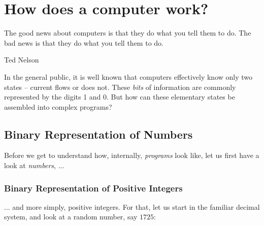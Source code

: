 \chapter{How does a computer work?}
\epigraph{The good news about computers is that they do what you tell them to do. The bad news is that they do what you tell them to do.}{Ted Nelson}

In the general public, it is well known that computers effectively know only two states -- current flows or does not. These \emph{bits} of information are commonly represented by the digits 1 and 0. But how can these elementary states be assembled into complex programs?

\section{Binary Representation of Numbers}
Before we get to understand how, internally, \emph{programs} look like, let us first have a look at \emph{numbers}, ...

\subsection{Binary Representation of Positive Integers} \label{sec:BinaryNumbers}
... and more simply, positive integers. For that, let us start in the familiar decimal system, and look at a random number, say $1725$:
%
\begin{defbox}
\begin{center}
\end{center}
\end{defbox}

